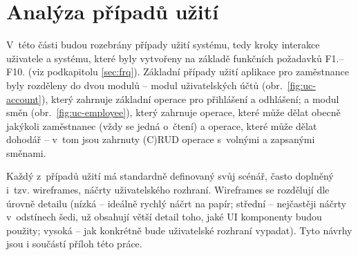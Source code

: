 \documentclass[twoside]{ctuthesis}
\begin{document}
%
%

\newpage
\section{Analýza případů užití}\label{uc-analysis}
V~této části budou rozebrány případy užití systému, tedy kroky interakce uživatele a systému, které byly vytvořeny na základě funkčních požadavků F1.--F10. (viz podkapitolu \ref{sec:frq}). Základní případy užití aplikace pro zaměstnance byly rozděleny do dvou modulů -- modul uživatelských účtů (obr.~\ref{fig:uc-account}), který zahrnuje základní operace pro přihlášení a odhlášení; a modul směn (obr.~\ref{fig:uc-employee}), který zahrnuje operace, které může dělat obecně jakýkoli zaměstnanec (vždy se jedná o~čtení) a operace, které může dělat dohodář -- v~tom jsou zahrnuty (C)RUD operace s~volnými a zapsanými směnami.

Každý z~případů užití má standardně definovaný svůj scénář, často doplněný i~tzv. wireframes, náčrty uživatelského rozhraní. Wi\-re\-fra\-mes se rozdělují dle úrovně detailu (nízká -- ideálně rychlý náčrt na papír; střední -- nejčastěji náčrty v~odstínech šedi, už obsahují větší detail toho, jaké UI kom\-po\-nen\-ty budou použity; vysoká -- jak konkrétně bude uživatelské rozhraní vypadat). Tyto návrhy jsou i součástí příloh této práce.
\end{document}
